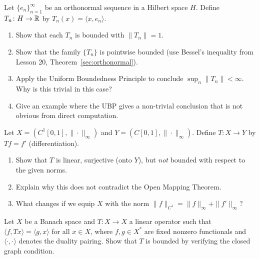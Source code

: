 \documentclass[11pt,a4paper]{article}
\begin{document}
\begin{exercise}
\label{ex:ubp-fourier}
Let $\{e_n\}_{n=1}^\infty$ be an orthonormal sequence in a Hilbert
space $H$. Define $T_n \colon H \to \mathbb{R}$ by
$T_n(x) = \langle x, e_n \rangle$.
\begin{enumerate}[label=(\alph*)]
    \item Show that each $T_n$ is bounded with $\|T_n\| = 1$.
    \item Show that the family $\{T_n\}$ is pointwise bounded (use
          Bessel's inequality from Lesson 20,
          Theorem~\ref{sec:orthonormal}).
    \item Apply the Uniform Boundedness Principle to conclude
          $\sup_n \|T_n\| < \infty$. Why is this trivial in this case?
    \item Give an example where the UBP gives a non-trivial conclusion
          that is not obvious from direct computation.
\end{enumerate}
\end{exercise}

\begin{exercise}
\label{ex:omt-fail}
Let $X = (C^1[0,1], \|\cdot\|_\infty)$ and $Y = (C[0,1], \|\cdot\|_\infty)$.
Define $T \colon X \to Y$ by $Tf = f'$ (differentiation).
\begin{enumerate}[label=(\alph*)]
    \item Show that $T$ is linear, surjective (onto $Y$), but
          \emph{not} bounded with respect to the given norms.
    \item Explain why this does not contradict the Open Mapping Theorem.
    \item What changes if we equip $X$ with the norm
          $\|f\|_{C^1} = \|f\|_\infty + \|f'\|_\infty$?
\end{enumerate}
\end{exercise}

\begin{exercise}
\label{ex:cgt-application}
Let $X$ be a Banach space and $T \colon X \to X$ a linear operator such
that $\langle f, Tx \rangle = \langle g, x \rangle$ for all $x \in X$,
where $f, g \in X^*$ are fixed nonzero functionals and $\langle \cdot, \cdot \rangle$
denotes the duality pairing. Show that $T$ is bounded by verifying the
closed graph condition.
\end{exercise}
\end{document}
